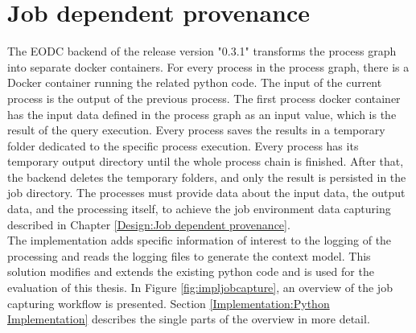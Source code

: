 \documentclass[draft,final]{vutinfth} %
\begin{document}
\section{Job dependent provenance}\label{Implementation:Job dependent provenance}
The EODC backend of the release version "0.3.1" transforms the process graph into separate docker containers. For every process in the process graph, there is a Docker container running the related python code. The input of the current process is the output of the previous process. The first process docker container has the input data defined in the process graph as an input value, which is the result of the query execution. Every process saves the results in a temporary folder dedicated to the specific process execution. Every process has its temporary output directory until the whole process chain is finished. After that, the backend deletes the temporary folders, and only the result is persisted in the job directory.
The processes must provide data about the input data, the output data, and the processing itself, to achieve the job environment data capturing described in Chapter \ref{Design:Job dependent provenance}. \\ 
The implementation adds specific information of interest to the logging of the processing and reads the logging files to generate the context model. This solution modifies and extends the existing python code and is used for the evaluation of this thesis. In Figure \ref{fig:impljobcapture}, an overview of the job capturing workflow is presented. Section \ref{Implementation:Python Implementation} describes the single parts of the overview in more detail.
\end{document}
